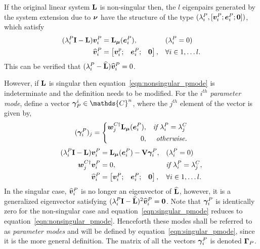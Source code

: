 If the original linear system $\mathbf{L}$ is non-singular then, the $l$ eigenpairs generated by the system extension due to $\boldsymbol{\nu}$ have the structure of the type $(\lambda^{P}_{i}, [\boldsymbol{v}^{P}_{i};\boldsymbol{e}^{P}_{i}; \boldsymbol{0}])$, which satisfy
\begin{subequations}
	\label{eqn:nonsingular_pmode} 
	\begin{align}
		(\lambda^{P}_{i}\mathbf{I} - \mathbf{L})\boldsymbol{v}^{P}_{i} &= \mathbf{L}_{\boldsymbol{\mu}}(\boldsymbol{e}^{P}_{i}), &&  (\lambda^{P}_{i} = 0) \\
	  			{\widehat{\boldsymbol{v}}}^{P}_{i} &= \begin{bmatrix}
	  	\boldsymbol{v}^{p}_{i}; &
	  	\boldsymbol{e}^{P}_{i}; &
	  	\boldsymbol{0}
	  \end{bmatrix}, && \forall i \in 1,\ldots l.
	\end{align}
\end{subequations}
This can be verified that $(\lambda^{P}_{i} - \mathbf{\widehat{L}}){\widehat{\boldsymbol{v}}}^{P}_{i} = 0$. 

However, if $\mathbf{L}$ is singular then equation~\eqref{eqn:nonsingular_pmode} is indeterminate and the definition needs to be modified. For the $i^{th}$ \emph{parameter mode}, define a vector $\vfield{\gamma}^{i}_{P} \in \mathds{C}^{n}$, where the $j^{th}$ element of the vector is given by,
\begin{equation}
	(\boldsymbol{\gamma}^{P}_{i})_{j} =
	\left\lbrace
	\begin{split}
		\boldsymbol{w}^{C\dagger}_{j}\mathbf{L}_{\boldsymbol{\mu}}(\boldsymbol{e}^{P}_{i}),  && \textit{if } \lambda^{P}_{i} = \lambda^{C}_{j} \\
		0,						 && \textit{otherwise.}	
	\end{split}\right.
\end{equation}
\begin{subequations}
	\label{eqn:singular_pmode}
	\begin{align}
		(\lambda^{P}_{i}\mathbf{I} - \mathbf{L})\boldsymbol{v}^{P}_{i} &= \mathbf{L}_{\boldsymbol{\mu}}(\boldsymbol{e}^{P}_{i}) - \mathbf{V}\boldsymbol{\gamma}^{P}_{i}, &&  (\lambda^{P}_{i} = 0) \\
		\boldsymbol{w}^{C\dagger}_{j}\boldsymbol{v}^{P}_{i} &= 0, && \textit{if } \lambda^{P}_{i} = \lambda^{C}_{j}, \\
		{\widehat{\boldsymbol{v}}}^{P}_{i} &= \begin{bmatrix}
			\boldsymbol{v}^{P}_{i}; &
			\boldsymbol{e}^{P}_{i}; &
			\boldsymbol{0}
		\end{bmatrix}, && \forall i \in 1,\ldots l.
	\end{align}
\end{subequations}
In the singular case, ${\widehat{\boldsymbol{v}}}^{P}_{i}$ is no longer an eigenvector of $\mathbf{\widehat{L}}$, however, it is a generalized eigenvector satisfying $(\lambda^{P}_{i}\mathbf{I} - \mathbf{\widehat{L}})^{2}{\widehat{\boldsymbol{v}}}^{P}_{i} = \boldsymbol{0}$. Note that $\boldsymbol{\gamma}^{P}_{i}$ is identically zero for the non-singular case and equation~\eqref{eqn:singular_pmode} reduces to equation~\eqref{eqn:nonsingular_pmode}. Henceforth these modes shall be referred to as \emph{parameter modes} and will be defined by equation~\eqref{eqn:singular_pmode}, since it is the more general definition. The matrix of all the vectors $\boldsymbol{\gamma}^{P}_{i}$ is denoted $\mathbf{\Gamma}_{P}$. 

